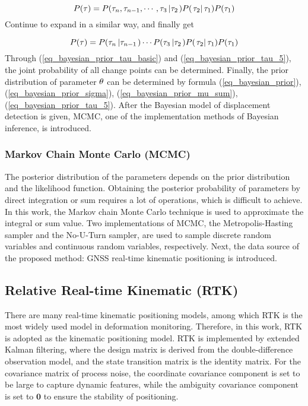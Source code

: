 \documentclass[final,3p,times]{elsarticle}
\begin{document}
	\begin{equation}\label{eq_bayesian_prior_tau_4}
	P({\bf{\tau }}) = P({\tau _n},{\tau _{n - 1}}, \cdots ,{\tau _3}\left| {{\tau _2}} \right.)P(\left. {{\tau _2}} \right|{\tau _1})P({\tau _1})
	\end{equation}
	Continue to expand in a similar way, and finally get
	
	\begin{equation}\label{eq_bayesian_prior_tau_5}
	P({\bf{\tau }}) = P({\tau _n}\left| {{\tau _{n - 1}}} \right.) \cdots P({\tau _3}\left| {{\tau _2}} \right.)P(\left. {{\tau _2}} \right|{\tau _1})P({\tau _1})
	\end{equation}
	Through (\ref{eq_bayesian_prior_tau_basic}) and (\ref{eq_bayesian_prior_tau_5}), the joint probability of all change points can be determined. Finally, the prior distribution of parameter ${\bf{\theta }}$ can be determined by formula (\ref{eq_bayesian_prior}), (\ref{eq_bayesian_prior_sigma}), (\ref{eq_bayesian_prior_mu_sum}), (\ref{eq_bayesian_prior_tau_5}).  After the Bayesian model of displacement detection is given, MCMC, one of the implementation methods of Bayesian inference, is introduced.
	
	\subsubsection{Markov Chain Monte Carlo (MCMC)}
	The posterior distribution of the parameters depends on the prior distribution and the likelihood function. Obtaining the posterior probability of parameters by direct integration or sum requires a lot of operations, which is difficult to achieve\cite{robert2013monte}. In this work, the Markov chain Monte Carlo technique is used to approximate the integral or sum value.  Two implementations of MCMC,  the Metropolis-Hasting sampler\cite{chib1995understanding} and the No-U-Turn sampler\cite{hoffman2014no}, are used to sample discrete random variables and continuous random variables, respectively. Next, the data source of the proposed method: GNSS real-time kinematic positioning is introduced.
	
	\subsection{Relative Real-time Kinematic (RTK)}
	There are many real-time kinematic positioning models, among which RTK is the most widely used model in deformation monitoring.
	\textcolor{r_s}{Therefore, in this work, RTK is adopted as the kinematic positioning model.
	RTK is implemented by extended Kalman filtering, where the design matrix is derived from the double-difference observation model, and the state transition matrix is the identity matrix.
For the covariance matrix of process noise, the coordinate covariance component is set to be large to capture dynamic features, while the ambiguity covariance component is set to $\mathbf{0}$ to ensure the stability of positioning\cite{takasu2011rtklib}.
}
\end{document}

